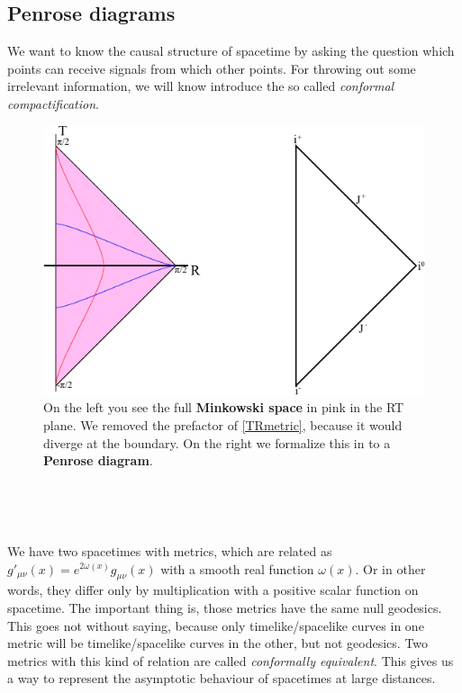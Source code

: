 \subsection{Penrose diagrams}
	We want to know the causal structure of spacetime by asking the question which points can receive signals from which other points. 
For throwing out some irrelevant information, we will know introduce the so called \textit{conformal compactification}.
\begin{figure}[tbp]	
		\begin{center}
		\includegraphics[scale=1]{flatpenrose}
		\end{center}
		\caption{On the left you see the full \textbf{Minkowski space} in pink in the RT plane. We removed the prefactor of \eqref{TRmetric}, because it would diverge at the boundary. On the right we formalize this in to a \textbf{Penrose diagram}.}\label{flatpenrose}
		\end{figure}
\parbox{\linewidth}{~}
\hfill
\parbox{0.02\linewidth}{~}
\begin{minipage}[][][c]{0.96\textwidth}
We have two spacetimes with metrics, which are related as $g'_{\mu\nu}(x)=e^{2\omega(x)}g_{\mu\nu}(x)$ with a smooth real function $\omega(x)$. Or in other words, they differ only by multiplication with a positive scalar function on spacetime. The important thing is, those metrics have the same null geodesics.
This goes not without saying, because only timelike/spacelike curves in one metric will be timelike/spacelike curves in the other, but not geodesics.
Two metrics with this kind of relation are called \textit{conformally equivalent}. 
This gives us a way to represent the asymptotic behaviour of spacetimes at large distances.
\end{minipage}
\hfill

